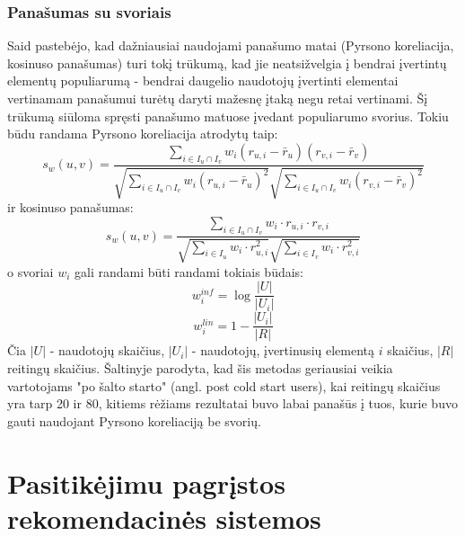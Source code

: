 \documentclass{VUMIFInfMagistrinis}
\begin{document}
\subsubsection{Panašumas su svoriais}
 Said \cite{13} pastebėjo, kad dažniausiai naudojami panašumo matai (Pyrsono koreliacija, kosinuso panašumas) turi tokį trūkumą, kad jie neatsižvelgia į bendrai įvertintų elementų populiarumą - bendrai daugelio naudotojų įvertinti elementai vertinamam panašumui turėtų daryti mažesnę įtaką negu retai vertinami. Šį trūkumą siūloma spręsti panašumo matuose įvedant populiarumo svorius.
\newline
\indent
Tokiu būdu randama Pyrsono koreliacija atrodytų taip:
\begin{equation}
	s_w(u,v) = \frac{\sum \limits_{i\in I_u \cap I_v }w_i(r_{u,i}-\bar{r}_u)(r_{v,i}-\bar{r}_v)}{\sqrt{\sum\limits_{i \in I_u \cap I_v }w_i(r_{u,i} - \bar{r}_u)^2}\sqrt{\sum\limits_{i \in I_u \cap I_v }w_i(r_{v,i} - \bar{r}_v)^2}}
\end{equation}
ir kosinuso panašumas:
	\begin{equation}
	s_w(u,v) = \frac{\sum \limits_{i\in I_u \cap I_v} w_i \cdot r_{u,i} \cdot r_{v,i}}{\sqrt{\sum\limits_{i \in I_u} w_i \cdot r_{u,i}^2}\sqrt{\sum\limits_{i \in I_v} w_i \cdot r_{v,i}^2}}
	\end{equation}
o svoriai $w_i$ gali randami būti randami tokiais būdais:
	\begin{equation}
	w_i^{inf} = \log \frac{|U|}{|U_i|}
	\end{equation}
	\begin{equation}
	w_i^{lin} = 1 - \frac{|U_i|}{|R|}
	\end{equation}
Čia $|U|$ - naudotojų skaičius, $|U_i|$ - naudotojų, įvertinusių elementą $i$ skaičius, $|R|$ reitingų skaičius.
\newline
\indent
Šaltinyje \cite{13} parodyta, kad šis metodas geriausiai veikia vartotojams "po šalto starto" (angl. post cold start users), kai reitingų skaičius yra tarp 20 ir 80, kitiems rėžiams rezultatai buvo labai panašūs į tuos, kurie buvo gauti naudojant Pyrsono koreliaciją be svorių.  
\section{Pasitikėjimu pagrįstos rekomendacinės sistemos}
\end{document}
